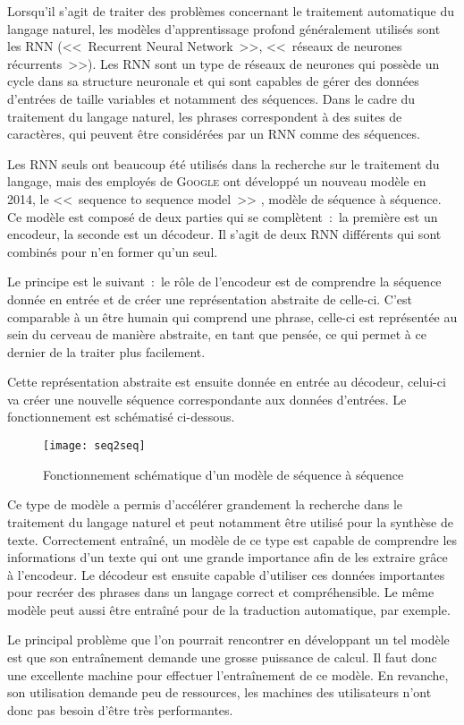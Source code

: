 Lorsqu'il s'agit de traiter des problèmes concernant le traitement automatique du langage naturel, les modèles d'apprentissage profond généralement utilisés sont les RNN (<<~Recurrent Neural Network~>>, <<~réseaux de neurones récurrents~>>).
Les RNN sont un type de réseaux de neurones qui possède un cycle dans sa structure neuronale et qui sont capables de gérer des données d'entrées de taille variables et notamment des séquences.
Dans le cadre du traitement du langage naturel, les phrases correspondent à des suites de caractères, qui peuvent être considérées par un RNN comme des séquences.

Les RNN seuls ont beaucoup été utilisés dans la recherche sur le traitement du langage, mais des employés de \textsc{Google} ont développé un nouveau modèle en 2014, le <<~sequence to sequence model~>> \cite{seq2seq}, modèle de séquence à séquence.
Ce modèle est composé de deux parties qui se complètent~:~la première est un encodeur, la seconde est un décodeur.
Il s'agit de deux RNN différents qui sont combinés pour n'en former qu'un seul.

Le principe est le suivant~:~le rôle de l'encodeur est de comprendre la séquence donnée en entrée et de créer une représentation abstraite de celle-ci.
C'est comparable à un être humain qui comprend une phrase, celle-ci est représentée au sein du cerveau de manière abstraite, en tant que pensée, ce qui permet à ce dernier de la traiter plus facilement.

Cette représentation abstraite est ensuite donnée en entrée au décodeur, celui-ci va créer une nouvelle séquence correspondante aux données d'entrées.
Le fonctionnement est schématisé ci-dessous.

\FloatBarrier
\begin{figure}[h!]
    \begin{center}
        \texttt{[image: seq2seq]}
    \end{center}
    \caption{Fonctionnement schématique d'un modèle de séquence à séquence}
    \label{figure:seq2seq}
\end{figure}
\FloatBarrier

Ce type de modèle a permis d'accélérer grandement la recherche dans le traitement du langage naturel et peut notamment être utilisé pour la synthèse de texte.
Correctement entraîné, un modèle de ce type est capable de comprendre les informations d'un texte qui ont une grande importance afin de les extraire grâce à l'encodeur.
Le décodeur est ensuite capable d'utiliser ces données importantes pour recréer des phrases dans un langage correct et compréhensible.
Le même modèle peut aussi être entraîné pour de la traduction automatique, par exemple.

Le principal problème que l'on pourrait rencontrer en développant un tel modèle est que son entraînement demande une grosse puissance de calcul.
Il faut donc une excellente machine pour effectuer l'entraînement de ce modèle.
En revanche, son utilisation demande peu de ressources, les machines des utilisateurs n'ont donc pas besoin d'être très performantes.
